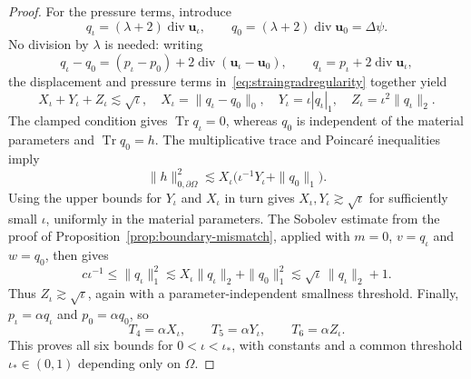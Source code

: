\documentclass[10pt]{amsart}
\renewcommand{\div}{\operatorname{div}}
\numberwithin{equation}{section}
\begin{document}
\begin{proof}
For the pressure terms, introduce
\[
q_\iota=(\lambda+2)\div\boldsymbol u_\iota,
\qquad q_0=(\lambda+2)\div\boldsymbol u_0=\Delta\psi.
\]
No division by $\lambda$ is needed: writing
\[
q_\iota-q_0=(p_\iota-p_0)+2\div(\boldsymbol u_\iota-\boldsymbol u_0),
\qquad q_\iota=p_\iota+2\div\boldsymbol u_\iota,
\]
the displacement and pressure terms in~\eqref{eq:straingradregularity} together yield
\[
X_\iota+Y_\iota+Z_\iota\lesssim\sqrt\iota,
\quad
X_\iota=\|q_\iota-q_0\|_0,\quad
Y_\iota=\iota|q_\iota|_1,\quad
Z_\iota=\iota^2\|q_\iota\|_2.
\]
The clamped condition gives $\operatorname{Tr}q_\iota=0$, whereas $q_0$ is independent of the material parameters and $\operatorname{Tr}q_0=h$. The multiplicative trace and Poincar\'e inequalities imply
\[
\|h\|_{0,\partial\Omega}^2
\lesssim X_\iota\big(\iota^{-1}Y_\iota+\|q_0\|_1\big).
\]
Using the upper bounds for $Y_\iota$ and $X_\iota$ in turn gives $X_\iota,Y_\iota\gtrsim\sqrt\iota$ for sufficiently small $\iota$, uniformly in the material parameters. The Sobolev estimate from the proof of Proposition~\ref{prop:boundary-mismatch}, applied with $m=0$, $v=q_\iota$ and $w=q_0$, then gives
\[
c\iota^{-1}\leq\|q_\iota\|_1^2
\lesssim X_\iota\|q_\iota\|_2+\|q_0\|_1^2
\lesssim\sqrt\iota\,\|q_\iota\|_2+1.
\]
Thus $Z_\iota\gtrsim\sqrt\iota$, again with a parameter-independent smallness threshold. Finally, $p_\iota=\alpha q_\iota$ and $p_0=\alpha q_0$, so
\[
T_4=\alpha X_\iota,\qquad T_5=\alpha Y_\iota,\qquad T_6=\alpha Z_\iota.
\]
This proves all six bounds for $0<\iota<\iota_\ast$, with constants and a common threshold $\iota_\ast\in(0,1)$ depending only on $\Omega$.


\end{proof}
\end{document}
